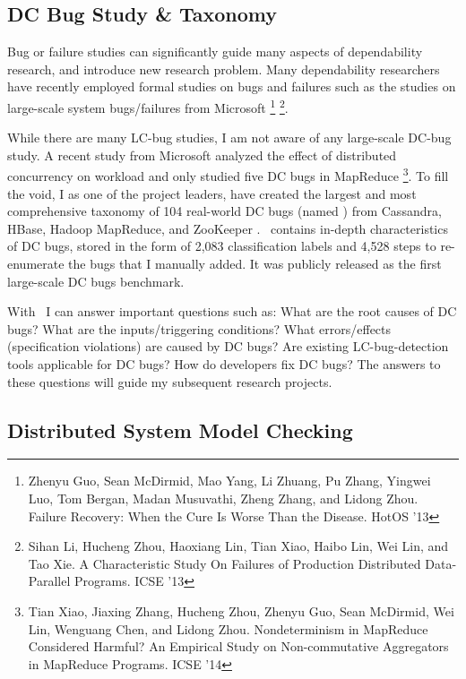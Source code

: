 \documentclass[11pt]{article}
\begin{document}
\subsection{DC Bug Study \& Taxonomy} 

Bug or failure studies can significantly guide many aspects of dependability
research, and introduce new research problem. Many dependability researchers
have recently employed formal studies on bugs and failures such as the studies
on large-scale system bugs/failures from Microsoft \footnote{Zhenyu Guo, Sean
McDirmid, Mao Yang, Li Zhuang, Pu Zhang, Yingwei Luo, Tom Bergan, Madan
Musuvathi, Zheng Zhang, and Lidong Zhou.  Failure Recovery: When the Cure Is
Worse Than the Disease. HotOS '13} \footnote{Sihan Li, Hucheng Zhou, Haoxiang
Lin, Tian Xiao, Haibo Lin, Wei Lin, and Tao Xie. A Characteristic Study On
Failures of Production Distributed Data-Parallel Programs. ICSE '13}.

While there are many LC-bug studies, I am not aware of any large-scale DC-bug
study. A recent study from Microsoft analyzed the effect of distributed
concurrency on workload and only studied five DC bugs in MapReduce
\footnote{Tian Xiao, Jiaxing Zhang, Hucheng Zhou, Zhenyu Guo, Sean McDirmid, Wei
Lin, Wenguang Chen, and Lidong Zhou. Nondeterminism in MapReduce Considered
Harmful?  An Empirical Study on Non-commutative Aggregators in MapReduce
Programs. ICSE '14}. To fill the void, I as one of the project leaders, have
created the largest and most comprehensive taxonomy of 104 real-world DC bugs
(named \taxdc) from Cassandra, HBase, Hadoop MapReduce, and ZooKeeper
\cite{Leesatapornwongsa+16-TaxDC}. \taxdc\ contains in-depth characteristics of DC
bugs, stored in the form of 2,083 classification labels and 4,528 steps to
re-enumerate the bugs that I manually added. It was publicly released as the
first large-scale DC bugs benchmark.

With \taxdc\, I can answer important questions such as: 
What are the root causes of DC bugs?
What are the inputs/triggering conditions? 
What errors/effects (specification violations) are caused by DC bugs?
Are existing LC-bug-detection tools applicable for DC bugs? 
How do developers fix DC bugs? 
The answers to these questions will guide my subsequent research projects.

\subsection{Distributed System Model Checking}
\end{document}
